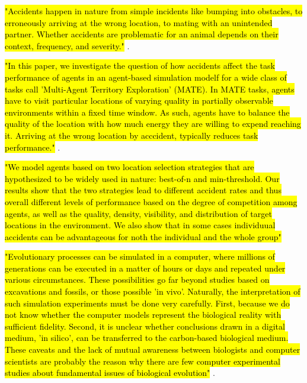 \hl{"Accidents happen in nature from simple incidents like bumping into obstacles, to erroneously arriving at the wrong location, to mating with an unintended partner. Whether accidents are problematic for an animal depends on their context, frequency, and severity."} \cite{ferreira2018accidental}.

\hl{"In this paper, we investigate the question of how accidents affect the task performance of agents in an agent-based simulation modelf for a wide class of tasks call 'Multi-Agent Territory Exploration' (MATE). In MATE tasks, agents have to visit particular locations of varying quality in partially observable environments within a fixed time window. As such, agents have to balance the quality of the location with how much energy they are willing to expend reaching it. Arriving at the wrong location by acccident, typically reduces task performance."} \cite{ferreira2018accidental}.

\hl{"We model agents based on two location selection strategies that are hypothesized to be widely used in nature: best-of-n and min-threshold. Our results show that the two strategies lead to different accident rates and thus overall different levels of performance based on the degree of competition among agents, as well as the quality, density, visibility, and distribution of target locations in the environment. We also show that in some cases individuual accidents can  be advantageous for noth the individual and the whole group"} \cite{ferreira2018accidental}



\hl{"Evolutionary processes can be simulated in a computer, where millions of generations can be executed in a matter of hours or days and repeated under various circumstances. These possibilities go far beyond studies based on excavations and fossils, or those possible 'in vivo'. Naturally, the interpretation of such simulation experiments must be done very carefully. First, because we do not know whether the computer models represent the biological reality with sufficient fidelity. Second, it is unclear whether conclusions drawn in a digital medium, 'in silico', can be transferred to the carbon-based biological medium. These caveats and the lack of mutual awareness between biologists and computer scientists are probably the reason why there are few computer experimental studies about fundamental issues of biological evolution"} \cite{EibenSmith2003}.



